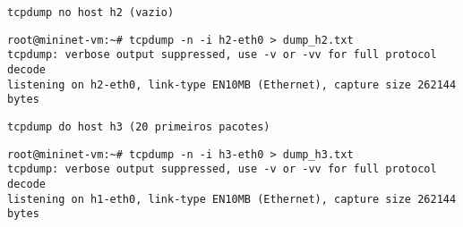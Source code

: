 \documentclass[12pt,letterpaper]{article}
\begin{document}
\begin{verbatim}
tcpdump no host h2 (vazio)
\end{verbatim}

\begin{tiny}
\begin{verbatim}
root@mininet-vm:~# tcpdump -n -i h2-eth0 > dump_h2.txt
tcpdump: verbose output suppressed, use -v or -vv for full protocol decode
listening on h2-eth0, link-type EN10MB (Ethernet), capture size 262144 bytes
\end{verbatim}
\end{tiny}

\begin{verbatim}
tcpdump do host h3 (20 primeiros pacotes)
\end{verbatim}

\begin{tiny}
\begin{verbatim}
root@mininet-vm:~# tcpdump -n -i h3-eth0 > dump_h3.txt
tcpdump: verbose output suppressed, use -v or -vv for full protocol decode
listening on h1-eth0, link-type EN10MB (Ethernet), capture size 262144 bytes


\end{verbatim}
\end{tiny}
\end{document}
